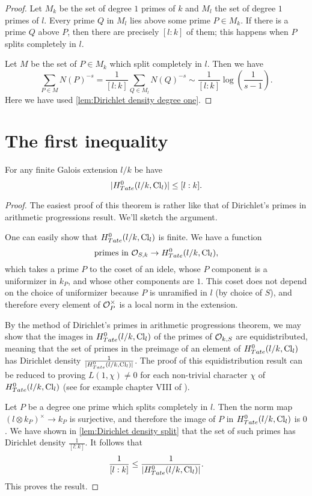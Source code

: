 \begin{proof}
	Let $M_k$ be the set of degree $1$ primes of $k$ and $M_l$ the set of degree $1$ primes of $l$.
	Every prime $Q$ in $M_l$ lies above some prime $P \in M_k$.
	If there is a prime $Q$ above $P$, then there are precisely $[l:k]$ of them; this happens when $P$
	splits completely in $l$.

	Let $M$ be the set of $P \in M_k$ which split completely in $l$.
	Then we have
	\[
		\sum_{P \in M} N(P)^{-s}
		=
		\frac{1}{[l:k]} \sum_{Q \in M_l} N(Q)^{-s}
		\sim \frac{1}{[l:k]} \log\left( \frac{1}{s-1}\right).
	\]
	Here we have used \ref{lem:Dirichlet density degree one}.
\end{proof}





\section{The first inequality}

\begin{theorem} \label{thm:first inequality}
	For any finite Galois extension $l/k$ be have
	\[
		|H^0_{Tate}(l/k, \mathrm{Cl}_{l}) | \le [l : k].
	\]
\end{theorem}

\begin{proof}
	The easiest proof of this theorem is rather like that of Dirichlet's primes in arithmetic
	progressions result.
	We'll sketch the argument.

	One can easily show that $H^0_{Tate}(l/k, \mathrm{Cl}_{l})$ is finite.
	We have a function
	\[
		\textrm{primes in ${\mathcal O}_{S,k}$} \to H^0_{Tate}(l/k, \mathrm{Cl}_{l}),
	\]
	which takes a prime $P$ to the coset of an idele, whose $P$ component is
	a uniformizer in $k_P$, and whose other components are $1$.
	This coset does not depend on the choice of uniformizer because $P$ is unramified in $l$
	(by choice of $S$), and therefore every element of ${\mathcal O}_P^\times$ is a local norm in the extension.

	By the method of Dirichlet's primes in arithmetic progressions theorem, we may show that
	the images in $H^0_{Tate}(l/k, \mathrm{Cl}_{l})$ of the primes of ${\mathcal O}_{k,S}$ are equidistributed,
	meaning that the set of primes in the preimage of an element of $H^0_{Tate}(l/k, \mathrm{Cl}_{l})$ has
	Dirichlet density $\frac{1}{|H^0_{Tate}(l/k, \mathrm{Cl}_{l})|}$. The proof of this equidistribution
	result can be reduced to proving $L(1,\chi) \ne 0$ for each non-trivial character
	$\chi$ of $H^0_{Tate}(l/k,\mathrm{Cl}_l)$ (see for example chapter VIII of \cite{cassells frohlich}).

	Let $P$ be a degree one prime which splits completely in $l$.
	Then the norm map $(l \otimes k_P)^\times \to k_P$ is surjective,
	and therefore the image of $P$ in $H^0_{Tate}(l/k, \mathrm{Cl}_{l})$ is $0$.
	We have shown in \ref{lem:Dirichlet density split} that the set of such primes has
	Dirichlet density $\frac{1}{[l:k]}$. It follows that
	\[
		\frac{1}{[l:k]} \le \frac{1}{|H^0_{Tate}(l/k, \mathrm{Cl}_{l})|}.
	\]
	This proves the result.
\end{proof}


